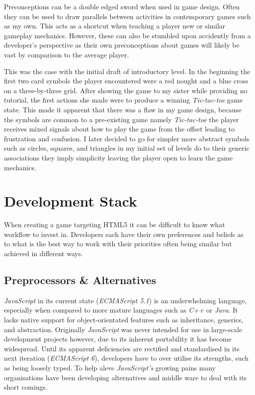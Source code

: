 \documentclass[final]{cmpreport}
\begin{document}
Preconceptions can be a double edged sword when used in game design. Often they can be used to draw parallels between activities in contemporary games such as my own. This acts as a shortcut when teaching a player new or similar gameplay mechanics. However, these can also be stumbled upon accidently from a developer's perspective as their own preconceptions about games will likely be vast by comparison to the average player.

This was the case with the initial draft of introductory level. In the beginning the first two card symbols the player encountered were a red nought and a blue cross on a three-by-three grid. After showing the game to my sister while providing no tutorial, the first actions she made were to produce a winning \emph{Tic-tac-toe} game state. This made it apparent that there was a flaw in my game design, because the symbols are common to a pre-existing game namely \emph{Tic-tac-toe} the player receives mixed signals about how to play the game from the offset leading to frustration and confusion. I later decided to go for simpler more abstract symbols such as circles, squares, and triangles in my initial set of levels do to their generic associations they imply simplicity leaving the player open to learn the game mechanics.

\section{Development Stack}
When creating a game targeting HTML5 it can be difficult to know what workflow to invest in. Developers each have their own preferences and beliefs as to what is the best way to work with their priorities often being similar but achieved in different ways.

\subsection{Preprocessors \& Alternatives}
\textit{JavaScript} in its current state (\textit{ECMAScript 5.1}) is an underwhelming language, especially when compared to more mature languages such as \textit{C++} or \textit{Java}. It lacks native support for object-orientated features such as inheritance, generics, and abstraction. Originally \textit{JavaScript} was never intended for use in large-scale development projects however, due to its inherent portability it has become widespread. Until its apparent deficiencies are rectified and standardised in its next iteration (\textit{ECMAScript 6}), developers have to over utilise its strengths, such as being loosely typed. To help aleve \textit{JavaScript's} growing pains many organisations have been developing alternatives and middle ware to deal with its short comings.
\end{document}
